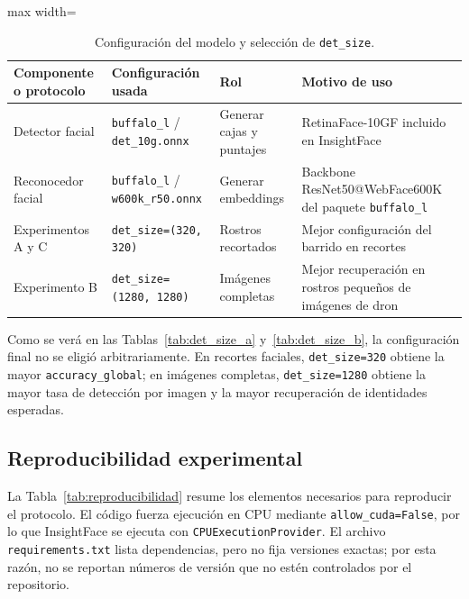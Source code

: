 \documentclass[11pt]{article}
\begin{document}
\begin{table}[H]
\centering
\caption{Configuración del modelo y selección de \texttt{det\_size}.}
\label{tab:config_modelo}
\begin{adjustbox}{max width=\textwidth}
\begin{tabular}{llll}
\toprule
Componente o protocolo & Configuración usada & Rol & Motivo de uso \\
\midrule
Detector facial & \texttt{buffalo\_l} / \texttt{det\_10g.onnx} & Generar cajas y puntajes & RetinaFace-10GF incluido en InsightFace \\
Reconocedor facial & \texttt{buffalo\_l} / \texttt{w600k\_r50.onnx} & Generar embeddings & Backbone ResNet50@WebFace600K del paquete \texttt{buffalo\_l} \\
Experimentos A y C & \texttt{det\_size=(320, 320)} & Rostros recortados & Mejor configuración del barrido en recortes \\
Experimento B & \texttt{det\_size=(1280, 1280)} & Imágenes completas & Mejor recuperación en rostros pequeños de imágenes de dron \\
\bottomrule
\end{tabular}
\end{adjustbox}
\end{table}

Como se verá en las Tablas~\ref{tab:det_size_a} y~\ref{tab:det_size_b}, la configuración final no se eligió arbitrariamente. En recortes faciales, \texttt{det\_size=320} obtiene la mayor \texttt{accuracy\_global}; en imágenes completas, \texttt{det\_size=1280} obtiene la mayor tasa de detección por imagen y la mayor recuperación de identidades esperadas.

\subsection{Reproducibilidad experimental}

La Tabla~\ref{tab:reproducibilidad} resume los elementos necesarios para reproducir el protocolo. El código fuerza ejecución en CPU mediante \texttt{allow\_cuda=False}, por lo que InsightFace se ejecuta con \texttt{CPUExecutionProvider}. El archivo \texttt{requirements.txt} lista dependencias, pero no fija versiones exactas; por esta razón, no se reportan números de versión que no estén controlados por el repositorio.
\end{document}

